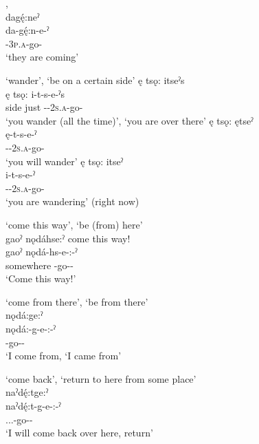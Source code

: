 \ea\label{ex:ppe2}  , \\
dagę́:neˀ\\
\gll da-gę́:n-e-ˀ\\
 {\cislocative}-\textsc{3p.a}-go-{\stative}\\
\glt `they are coming'
\z


\ea\label{ex:ppe3}  ‘wander’, ‘be on a certain side’
\ea ę tsǫ: itseˀs \\
\gll ę tsǫ: i-t-s-e-ˀs\\
side just {\prothetic}-{\cislocative}-\textsc{2s.a}-go-{\habitual}\\
\glt ‘you wander (all the time)’, `you are over there'
\ex ę tsǫ: ętseˀ\\
\gll ę-t-s-e-ˀ\\
 \fut-{\cislocative}-\textsc{2s.a}-go-{\punctual}\\
\glt `you will wander'
\ex ę tsǫ: itseˀ\\
\gll i-t-s-e-ˀ\\
 {\prothetic}-{\cislocative}-\textsc{2s.a}-go-{\stative}\\
\glt `you are wandering' (right now)
\z
\z

\ea\label{ex:ppe4}  ‘come this way’, ‘be (from) here’\\
gaoˀ nǫdáhse:ˀ come this way! \\
\gll gaoˀ nǫdá-hs-e-:-ˀ\\
 somewhere {\partitivecislocative}-go-{\purposive}-{\punctual}\\
\glt `Come this way!'
\z


\ea\label{ex:ppe5}  ‘come from there’, ‘be from there’\\
nǫdá:ge:ˀ \\
\gll nǫdá:-g-e-:-ˀ\\
 {\partitivecislocative}-go-{\purposive}-{\punctual}\\
\glt ‘I come from, `I came from'
\z


\ea\label{ex:ppe6}  ‘come back’, ‘return to here from some place’\\
naˀdę́:tge:ˀ\\
\gll naˀdę́:t-g-e-:-ˀ\\
 {\partitive.\dualic.\future.\cislocative}-go-{\purposive}-{\punctual}\\
\glt `I will come back over here, return'
\z



